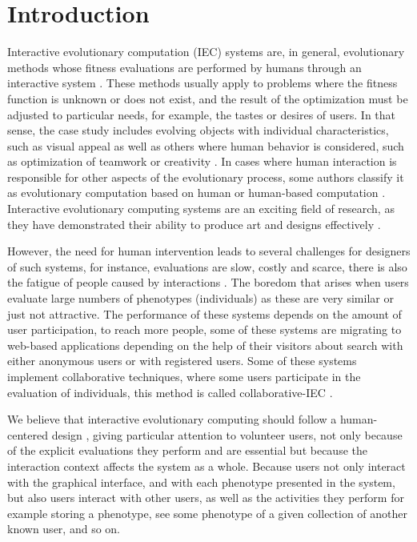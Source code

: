 \chapter{Introduction} \label{introduction}


\par Interactive evolutionary computation (IEC) systems are, in general, evolutionary
methods whose fitness evaluations are performed by humans through an interactive
system \cite{eiben2015introduction}.
These methods usually apply to problems
where the fitness function is unknown or does not exist, and the result of the
optimization must be adjusted to particular needs, for example, the tastes or
desires of users. In that sense, the case study includes evolving objects
with individual characteristics, such as visual appeal as well as others where
human behavior is considered, such as optimization of teamwork
\cite{kosorukoff2002evolutionary} or creativity \cite{yu2011cooks}. In cases
where human interaction is  responsible for other aspects of the evolutionary
process, some authors classify it as evolutionary computation based on human
\cite{kosorukoff2001human} or human-based computation \cite{quinn2011human}.
Interactive evolutionary computing systems are an exciting field of research, as
they have demonstrated their ability to produce art and designs effectively
\cite{bentley1999introduction}\cite{kowaliw2012promoting}\cite{sims1991artificial}\cite{todd1994evolutionary}.

\par However, the need for human intervention leads to several challenges for
designers of such systems, for instance, evaluations are slow, costly and
scarce, there is also the fatigue of people caused by interactions
\cite{takagi1998interactive}. The boredom that arises when users evaluate large
numbers of phenotypes (individuals) as these are very similar or just not attractive. The
performance of these systems depends on the amount of user participation, to
reach more people, some of these systems are migrating to web-based applications
depending on the help of their visitors about search with either anonymous users
or with registered users. Some of these systems implement collaborative
techniques, where some users participate in the evaluation of individuals, this
method is called collaborative-IEC \cite{secretan2008picbreeder}\cite{seyama2016development}\cite{wagy2014collective}.

\par We believe that interactive evolutionary computing should follow a human-centered
design \cite{greenhouse2012human}, giving particular attention to volunteer
users, not only because of the explicit evaluations they perform and are
essential but because the interaction context affects the system as a whole.
Because users not only interact with the graphical interface, and with each
phenotype presented in the system, but also users interact with other users, as
well as the activities they perform for example storing a phenotype, see some
phenotype of a given collection of another known user, and so on.

